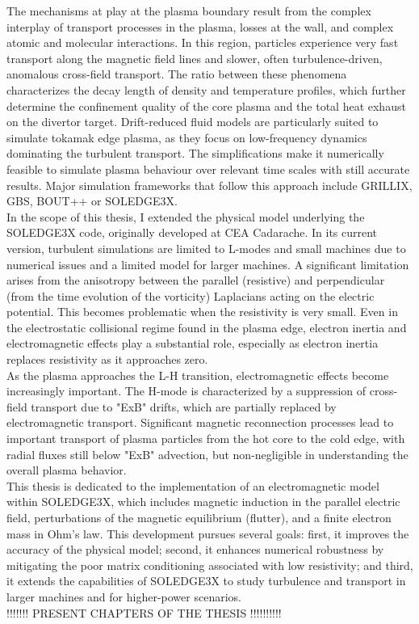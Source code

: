 The mechanisms at play at the plasma boundary result from the complex interplay of transport processes in the plasma, losses at the wall, and complex atomic and molecular interactions. In this region, particles experience very fast transport along the magnetic field lines and slower, often turbulence-driven, anomalous cross-field transport\cite{loarte2007}. The ratio between these phenomena characterizes the decay length of density and temperature profiles, which further determine the confinement quality of the core plasma and the total heat exhaust on the divertor target. Drift-reduced fluid models are particularly suited to simulate tokamak edge plasma, as they focus on low-frequency dynamics dominating the turbulent transport. The simplifications make it numerically feasible to simulate plasma behaviour over relevant time scales with still accurate results. Major simulation frameworks that follow this approach include GRILLIX\cite{GrillixGeneralPaper,stegmeir2019}, GBS\cite{Ricci_2012,giacomin2022gbs}, BOUT++\cite{DUDSON_2009,dudson2015} or SOLEDGE3X\cite{tamain2016tokam3x,Bufferand_2021}. \\

In the scope of this thesis, I extended the physical model underlying the SOLEDGE3X code, originally developed at CEA Cadarache. In its current version, turbulent simulations are limited to L-modes and small machines due to numerical issues and a limited model for larger machines. A significant limitation arises from the anisotropy between the parallel (resistive) and perpendicular (from the time evolution of the vorticity) Laplacians acting on the electric potential. This becomes problematic when the resistivity is very small. Even in the electrostatic collisional regime found in the plasma edge, electron inertia and electromagnetic effects play a substantial role, especially as electron inertia replaces resistivity as it approaches zero. \\

As the plasma approaches the L-H transition, electromagnetic effects become increasingly important. The H-mode is characterized by a suppression of cross-field transport due to "ExB" drifts, which are partially replaced by electromagnetic transport. Significant magnetic reconnection processes lead to important transport of plasma particles from the hot core to the cold edge, with radial fluxes still below "ExB" advection, but non-negligible in understanding the overall plasma behavior. \\

This thesis is dedicated to the implementation of an electromagnetic model within SOLEDGE3X, which includes magnetic induction in the parallel electric field, perturbations of the magnetic equilibrium (flutter), and a finite electron mass in Ohm's law. This development pursues several goals: first, it improves the accuracy of the physical model; second, it enhances numerical robustness by mitigating the poor matrix conditioning associated with low resistivity; and third, it extends the capabilities of SOLEDGE3X to study turbulence and transport in larger machines and for higher-power scenarios. \\

!!!!!!! PRESENT CHAPTERS OF THE THESIS !!!!!!!!!!

